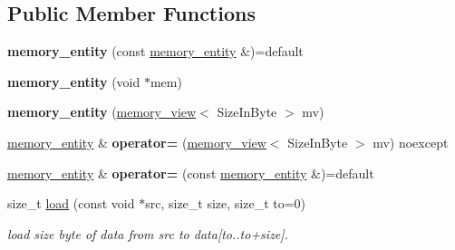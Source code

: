 \subsection*{Public Member Functions}
\begin{DoxyCompactItemize}
\item 
\mbox{\label{structouchi_1_1crypto_1_1memory__entity_a8a6cc91006ed3c1be5f1e2b66aff702b}} 
{\bfseries memory\+\_\+entity} (const \mbox{\hyperlink{structouchi_1_1crypto_1_1memory__entity}{memory\+\_\+entity}} \&)=default
\item 
\mbox{\label{structouchi_1_1crypto_1_1memory__entity_a9d833eeacf2a93604d9acaf58060e6c2}} 
{\bfseries memory\+\_\+entity} (void $\ast$mem)
\item 
\mbox{\label{structouchi_1_1crypto_1_1memory__entity_a459e6b406bb5fa2cf696da0110983bd7}} 
{\bfseries memory\+\_\+entity} (\mbox{\hyperlink{classouchi_1_1crypto_1_1memory__view}{memory\+\_\+view}}$<$ Size\+In\+Byte $>$ mv)
\item 
\mbox{\label{structouchi_1_1crypto_1_1memory__entity_ac87b49dd9785d95a9fff61696bedbb20}} 
\mbox{\hyperlink{structouchi_1_1crypto_1_1memory__entity}{memory\+\_\+entity}} \& {\bfseries operator=} (\mbox{\hyperlink{classouchi_1_1crypto_1_1memory__view}{memory\+\_\+view}}$<$ Size\+In\+Byte $>$ mv) noexcept
\item 
\mbox{\label{structouchi_1_1crypto_1_1memory__entity_a0fc13acb3adbfa0091cc73c16fa02e17}} 
\mbox{\hyperlink{structouchi_1_1crypto_1_1memory__entity}{memory\+\_\+entity}} \& {\bfseries operator=} (const \mbox{\hyperlink{structouchi_1_1crypto_1_1memory__entity}{memory\+\_\+entity}} \&)=default
\item 
size\+\_\+t \mbox{\hyperlink{structouchi_1_1crypto_1_1memory__entity_a64914a9119c3a872fcae17517045eb8e}{load}} (const void $\ast$src, size\+\_\+t size, size\+\_\+t to=0)
\begin{DoxyCompactList}\small\item\em load size byte of data from src to data\mbox{[}to..to+size\mbox{]}. \end{DoxyCompactList}\item 

\end{DoxyCompactItemize}

